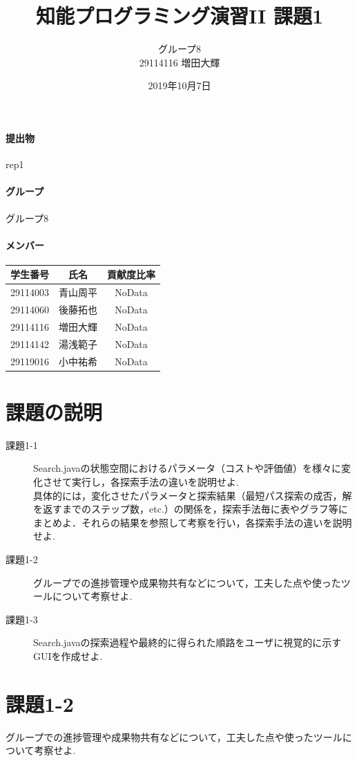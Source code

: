 \documentclass[uplatex,12pt]{jsarticle}
\title{知能プログラミング演習II 課題1}
\author{グループ8\\
  29114116 増田大輝\\
}
\date{2019年10月7日}
\begin{document}
\maketitle

\paragraph{提出物} rep1
\paragraph{グループ} グループ8

\paragraph{メンバー}
\begin{tabular}{|c|c|c|}
  \hline
  学生番号&氏名&貢献度比率\\
  \hline\hline
  29114003&青山周平&NoData\\
  \hline
  29114060&後藤拓也&NoData\\
  \hline
  29114116&増田大輝&NoData\\
  \hline
  29114142&湯浅範子&NoData\\
  \hline
  29119016&小中祐希&NoData\\
  \hline
\end{tabular}



\section{課題の説明}
\begin{description}
\item[課題1-1] Search.javaの状態空間におけるパラメータ（コストや評価値）を様々に変化させて実行し，各探索手法の違いを説明せよ. \\
具体的には，変化させたパラメータと探索結果（最短パス探索の成否，解を返すまでのステップ数，etc.）の関係を，探索手法毎に表やグラフ等にまとめよ．それらの結果を参照して考察を行い，各探索手法の違いを説明せよ. \\
\item[課題1-2] グループでの進捗管理や成果物共有などについて，工夫した点や使ったツールについて考察せよ.
\item[課題1-3] Search.javaの探索過程や最終的に得られた順路をユーザに視覚的に示すGUIを作成せよ. 
\end{description}

\section{課題1-2}
\begin{screen}
  グループでの進捗管理や成果物共有などについて，工夫した点や使ったツールについて考察せよ.
\end{screen}
\end{document}
